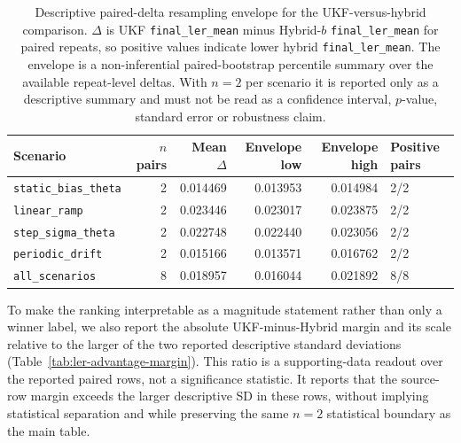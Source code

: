 \documentclass[11pt]{article}
\newcommand{\finalLER}{\texttt{final\_ler\_mean}}
\begin{document}
\begin{table}[t]
\centering
\small
\begin{tabular}{@{}lrrrrl@{}}
\toprule
Scenario & \(n\) pairs & Mean \(\Delta\) & Envelope low & Envelope high & Positive pairs \\
\midrule
\texttt{static\_bias\_theta} & 2 & 0.014469 & 0.013953 & 0.014984 & 2/2 \\
\texttt{linear\_ramp} & 2 & 0.023446 & 0.023017 & 0.023875 & 2/2 \\
\texttt{step\_sigma\_theta} & 2 & 0.022748 & 0.022440 & 0.023056 & 2/2 \\
\texttt{periodic\_drift} & 2 & 0.015166 & 0.013571 & 0.016762 & 2/2 \\
\texttt{all\_scenarios} & 8 & 0.018957 & 0.016044 & 0.021892 & 8/8 \\
\bottomrule
\end{tabular}
\caption{Descriptive paired-delta resampling envelope for the UKF-versus-hybrid
comparison.  \(\Delta\) is UKF \finalLER{} minus Hybrid-\(b\) \finalLER{} for
paired repeats, so positive values indicate lower hybrid \finalLER{}.  The
envelope is a non-inferential paired-bootstrap percentile summary over the
available repeat-level deltas.  With \(n=2\) per scenario it is reported only
as a descriptive summary and must not be read as a confidence interval,
\(p\)-value, standard error or robustness claim.}
\label{tab:paired-uncertainty}
\end{table}

To make the ranking interpretable as a magnitude statement rather than only a
winner label, we also report the absolute UKF-minus-Hybrid margin and its scale
relative to the larger of the two reported descriptive standard deviations
(Table~\ref{tab:ler-advantage-margin}).  This ratio is a supporting-data readout
over the reported paired rows, not a significance statistic.  It reports that
the source-row margin exceeds the larger descriptive SD in these rows, without
implying statistical separation and while preserving the same \(n=2\)
statistical boundary as the main table.
\end{document}
